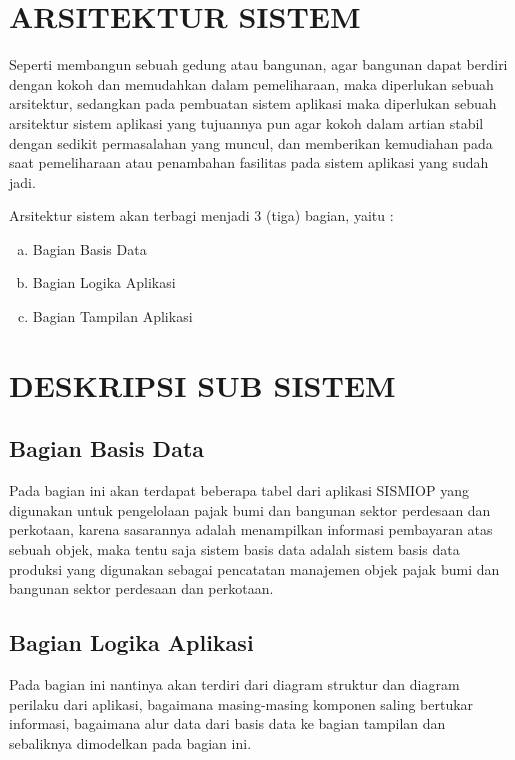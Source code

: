 \documentclass[pdftex,12pt, oneside]{article}
\begin{document}
\section{ARSITEKTUR SISTEM}

Seperti membangun sebuah gedung atau bangunan, agar bangunan dapat berdiri dengan kokoh dan memudahkan dalam pemeliharaan, maka diperlukan sebuah arsitektur, sedangkan pada pembuatan sistem aplikasi maka diperlukan sebuah arsitektur sistem aplikasi yang tujuannya pun agar kokoh dalam artian stabil dengan sedikit permasalahan yang muncul, dan memberikan kemudiahan pada saat pemeliharaan atau penambahan fasilitas pada sistem aplikasi yang sudah jadi.

Arsitektur sistem akan terbagi menjadi 3 (tiga) bagian, yaitu :

\begin{enumerate}[a.] 
	\item Bagian Basis Data
	\item Bagian Logika Aplikasi
	\item Bagian Tampilan Aplikasi
\end{enumerate}

\section{DESKRIPSI SUB SISTEM}

\subsection{Bagian Basis Data}

Pada bagian ini akan terdapat beberapa tabel dari aplikasi SISMIOP yang digunakan untuk pengelolaan pajak bumi dan bangunan sektor perdesaan dan perkotaan, karena sasarannya adalah menampilkan informasi pembayaran atas sebuah objek, maka tentu saja sistem basis data adalah sistem basis data produksi yang digunakan sebagai pencatatan manajemen objek pajak bumi dan bangunan sektor perdesaan dan perkotaan.

\subsection{Bagian Logika Aplikasi}

Pada bagian ini nantinya akan terdiri dari diagram struktur dan diagram perilaku dari aplikasi, bagaimana masing-masing komponen saling bertukar informasi, bagaimana alur data dari basis data ke bagian tampilan dan sebaliknya dimodelkan pada bagian ini.
\end{document}
